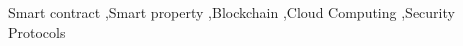 \begin{frontmatter}
\begin{abstract}
\end{abstract}

\begin{keyword}
Smart contract 
\sep Smart property
\sep Blockchain
\sep Cloud Computing
\sep Security Protocols


\end{keyword}

\end{frontmatter}
